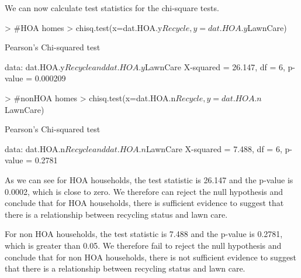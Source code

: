 \documentclass{article}
\begin{document}
We can now calculate test statistics for the chi-square tests. 
\begin{Schunk}
\begin{Sinput}
> #HOA homes
> chisq.test(x=dat.HOA.y$Recycle,y=dat.HOA.y$LawnCare)
\end{Sinput}
\begin{Soutput}
	Pearson's Chi-squared test

data:  dat.HOA.y$Recycle and dat.HOA.y$LawnCare
X-squared = 26.147, df = 6, p-value = 0.000209
\end{Soutput}
\begin{Sinput}
> #nonHOA homes
> chisq.test(x=dat.HOA.n$Recycle,y=dat.HOA.n$LawnCare)
\end{Sinput}
\begin{Soutput}
	Pearson's Chi-squared test

data:  dat.HOA.n$Recycle and dat.HOA.n$LawnCare
X-squared = 7.488, df = 6, p-value = 0.2781
\end{Soutput}
\end{Schunk}
As we can see for HOA households, the test statistic is 26.147 and the p-value is 0.0002, which is close to zero. We therefore can reject the null hypothesis and conclude that for HOA households, there is sufficient evidence to suggest that there is a relationship between recycling status and lawn care. 

For non HOA households, the test statistic is 7.488 and the p-value is 0.2781, which is greater than 0.05. We therefore fail to reject the null hypothesis and conclude that for non HOA households, there is not sufficient evidence to suggest that there is a relationship between recycling status and lawn care.
\end{document}
